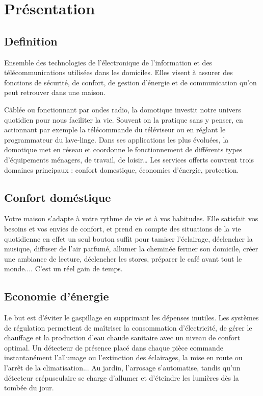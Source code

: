 \documentclass[12pt]{article}
\begin{document}

\section{Présentation}

\subsection{Definition}
Ensemble des technologies de l'électronique de l'information et des télécommunications utilisées dans les domiciles. Elles visent à assurer des fonctions de sécurité, de confort, de gestion d'énergie et de communication qu'on peut retrouver dans une maison.


Câblée ou fonctionnant par ondes radio, la domotique investit notre univers quotidien pour nous faciliter la vie. Souvent on la pratique sans y penser, en actionnant par exemple la télécommande du téléviseur ou en réglant le programmateur du lave-linge. Dans ses applications les plus évoluées, la domotique met en réseau et coordonne le fonctionnement de différents types d’équipements ménagers, de travail, de loisir… Les services offerts couvrent trois domaines principaux : confort domestique, économies d’énergie, protection.

\subsection{Confort doméstique}
Votre maison s'adapte à votre rythme de vie et à vos habitudes. Elle satisfait vos besoins et vos envies de confort, et prend en compte des situations de la vie quotidienne en effet un seul bouton suffit pour tamiser l'éclairage, déclencher la musique, diffuser de l'air parfumé, allumer la cheminée fermer son domicile, créer une ambiance de lecture, déclencher les stores, préparer le café avant tout le monde.... C’est un réel gain de temps.

\subsection{Economie d'énergie}
Le but est d’éviter le gaspillage en supprimant les dépenses inutiles. Les systèmes de régulation permettent de maîtriser la consommation d’électricité, de gérer le chauffage et la production d’eau chaude sanitaire avec un niveau de confort optimal. Un détecteur de présence placé dans chaque pièce commande instantanément l’allumage ou l’extinction des éclairages, la mise en route ou l’arrêt de la climatisation... Au jardin, l’arrosage s’automatise, tandis qu’un détecteur crépusculaire se charge d’allumer et d’éteindre les lumières dès la tombée du jour.
\end{document}
